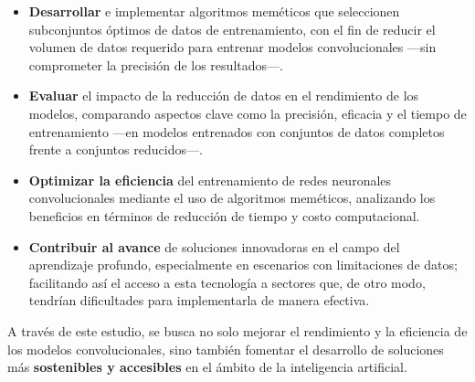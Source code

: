 \begin{itemize}
    \item \textbf{Desarrollar} e implementar algoritmos meméticos que seleccionen subconjuntos óptimos de datos de
entrenamiento, con el fin de reducir el volumen de datos requerido para entrenar modelos convolucionales —sin
comprometer la precisión de los resultados—.
    \item \textbf{Evaluar} el impacto de la reducción de datos en el rendimiento de los modelos, comparando aspectos
clave como la precisión, eficacia y el tiempo de entrenamiento —en modelos entrenados con conjuntos de datos completos
frente a conjuntos reducidos—.
    \item \textbf{Optimizar la eficiencia} del entrenamiento de redes neuronales convolucionales mediante el uso de
algoritmos meméticos, analizando los beneficios en términos de reducción de tiempo y costo computacional.
    \item \textbf{Contribuir al avance} de soluciones innovadoras en el campo del aprendizaje profundo, especialmente
en escenarios con limitaciones de datos; facilitando así el acceso a esta tecnología a sectores que, de otro modo,
tendrían dificultades para implementarla de manera efectiva.
\end{itemize}

A través de este estudio, se busca no solo mejorar el rendimiento y la eficiencia de los modelos convolucionales, sino
también fomentar el desarrollo de soluciones más \textbf{sostenibles y accesibles} en el ámbito de la inteligencia
artificial.
